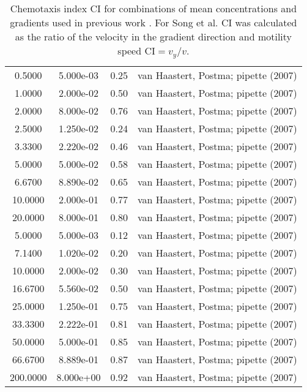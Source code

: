 \begin{table}[ht]
\begin{tabular}{|c|c|c|c|}
				 0.5000 & 5.000e-03 & 0.25 & van Haastert, Postma; pipette (2007) \\
				 1.0000 & 2.000e-02 & 0.50 & van Haastert, Postma; pipette (2007) \\
				 2.0000 & 8.000e-02 & 0.76 & van Haastert, Postma; pipette (2007) \\
				 2.5000 & 1.250e-02 & 0.24 & van Haastert, Postma; pipette (2007) \\
				 3.3300 & 2.220e-02 & 0.46 & van Haastert, Postma; pipette (2007) \\
				 5.0000 & 5.000e-02 & 0.58 & van Haastert, Postma; pipette (2007) \\
				 6.6700 & 8.890e-02 & 0.65 & van Haastert, Postma; pipette (2007) \\
				10.0000 & 2.000e-01 & 0.77 & van Haastert, Postma; pipette (2007) \\
				20.0000 & 8.000e-01 & 0.80 & van Haastert, Postma; pipette (2007) \\
				 5.0000 & 5.000e-03 & 0.12 & van Haastert, Postma; pipette (2007) \\
				 7.1400 & 1.020e-02 & 0.20 & van Haastert, Postma; pipette (2007) \\
				10.0000 & 2.000e-02 & 0.30 & van Haastert, Postma; pipette (2007) \\
				16.6700 & 5.560e-02 & 0.50 & van Haastert, Postma; pipette (2007) \\
				25.0000 & 1.250e-01 & 0.75 & van Haastert, Postma; pipette (2007) \\
				33.3300 & 2.222e-01 & 0.81 & van Haastert, Postma; pipette (2007) \\
				50.0000 & 5.000e-01 & 0.85 & van Haastert, Postma; pipette (2007) \\
				66.6700 & 8.889e-01 & 0.87 & van Haastert, Postma; pipette (2007) \\
			 200.0000 & 8.000e+00 & 0.92 & van Haastert, Postma; pipette (2007) \\
			\hline
		\end{tabular}
	\caption{Chemotaxis index CI for combinations of mean concentrations and gradients
	used in previous work \cite{song, SNRvh, eberhard1}. For Song et al. \cite{song}
	CI was calculated as the ratio of the velocity in the gradient direction and motility speed $\mathrm{CI} = v_y/v$.
	}
	\label{tab:ci_snr_others}
\end{table}
